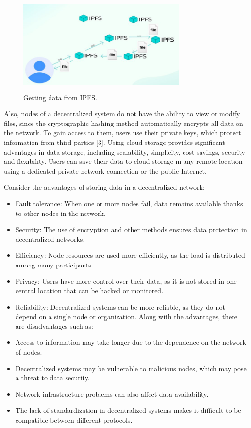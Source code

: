 \documentclass[10pt,conference,a4paper]{IEEEtran_EDM}
\begin{document}
\begin{figure}[htbp]
\includegraphics[width=8.5cm, height=5cm]{fig1.png}
\caption{Getting data from IPFS.}
\label{fig}
\end{figure}

Also, nodes of a decentralized system do not have the ability to view or modify files, since the cryptographic hashing method automatically encrypts all data on the network. To gain access to them, users use their private keys, which protect information from third parties [3].
Using cloud storage provides significant advantages in data storage, including scalability, simplicity, cost savings, security and flexibility. Users can save their data to cloud storage in any remote location using a dedicated private network connection or the public Internet.

Consider the advantages of storing data in a decentralized network:
\begin{itemize}
\item Fault tolerance: When one or more nodes fail, data remains available thanks to other nodes in the network.
\item Security: The use of encryption and other methods ensures data protection in decentralized networks.
\item Efficiency: Node resources are used more efficiently, as the load is distributed among many participants.
\item Privacy: Users have more control over their data, as it is not stored in one central location that can be hacked or monitored.
\item Reliability: Decentralized systems can be more reliable, as they do not depend on a single node or organization.
Along with the advantages, there are disadvantages such as:
\item Access to information may take longer due to the dependence on the network of nodes.
\item Decentralized systems may be vulnerable to malicious nodes, which may pose a threat to data security.
\item Network infrastructure problems can also affect data availability.
\item The lack of standardization in decentralized systems makes it difficult to be compatible between different protocols.
\end{itemize}
\end{document}
